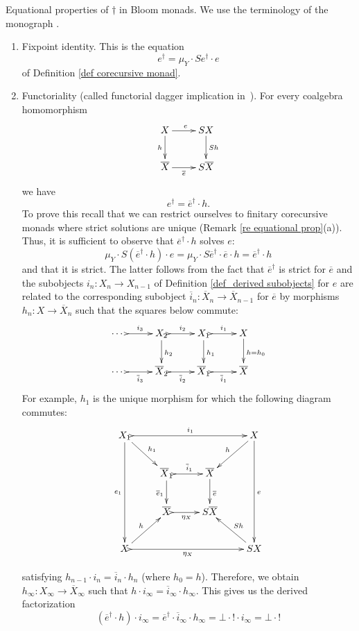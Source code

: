 \documentclass{LMCS}
\theoremstyle{plain}
\theoremstyle{definition}
\numberwithin{equation}{section}
\begin{document}
\begin{exa}
Equational properties of $\dag$ in Bloom monads. We use the terminology of the monograph \cite{be}.
\begin{enumerate}[label=\({\alph*}]
\item Fixpoint identity. This is the equation
$$e^\dag=\mu_Y\cdot Se^\dag\cdot e$$
of Definition \ref{def corecursive monad}.

\item Functoriality (called functorial dagger implication in~\cite{be}). For every coalgebra homomorphism
$$\xymatrix{
X\ar[r]^e\ar[d]_-h&SX\ar[d]^-{Sh}\\
\overline{X}\ar[r]_-{\overline{e}}&S\overline X
}$$
we have
$$e^\dag={\overline e}^\dagger\cdot h.$$
To prove this recall that we can restrict ourselves to finitary
corecursive monads where strict solutions are unique (Remark
\ref{re equational prop}(a)).
Thus, it is sufficient to observe that $\overline{e}^\dag\cdot h$ solves $e$:
$$\mu_Y\cdot S(\overline{e}^\dag\cdot h)\cdot e=\mu_Y\cdot S\overline e^\dag\cdot \overline e\cdot h=\overline e^\dag\cdot h$$
and that it is strict. The latter follows from the fact that $\overline e^\dag$ is strict for $\overline e$ and the subobjects $i_n:X_n\to X_{n-1}$ of Definition \ref{def_derived subobjects} for $e$ are related to the corresponding subobject $\overline i_n:\overline X_n\to \overline X_{n-1}$ for $\overline e$ by morphisms $h_n:X\to \overline X_n$ such that the squares below commute:
\[
\xymatrix{
  \cdots\  
  \ar@{>->}[r]^{i_3} 
  &
  X_2
  \ar@{>->}[r]^{i_2} 
  \ar[d]^{h_2}
  &
  X_1
  \ar@{>->}[r]^{i_1} 
  \ar[d]^{h_1}
  &
  X
  \ar[d]^{h = h_0}
  \\
  \cdots\ 
  \ar@{>->}[r]_{\overline i_3} 
  &
  \overline X_2
  \ar@{>->}[r]_{\overline i_2}
  &
  \overline X_1
  \ar@{>->}[r]_{\overline i_1}
  &
  \overline X 
}
\]
For example, $h_1$ is the unique morphism for which the following diagram commutes:
\[
\xymatrix{
  X_1
  \ar[ddd]_{e_1}
  \ar@{>->}[rrr]^-{i_1}
  \ar[rd]^{h_1}
  &&&
  X
  \ar[ddd]^{e}
  \ar[ld]_h
  \\
  &
  \overline X_1
  \ar@{>->}[r]^-{\overline i_1}
  \ar[d]_{\overline e_1}
  &
  \overline X
  \ar[d]^{\overline e}
  \\
  &
  \overline X
  \ar@{>->}[r]_-{\eta_X}
  &
  S\overline X
  \\
  X
  \ar@{>->}[rrr]_-{\eta_X}
  \ar[ru]^h
  &&&
  SX
  \ar[lu]_{Sh}
}
\]

satisfying $h_{n-1}\cdot i_n=\overline i_n\cdot h_n$ (where $h_0=h$). Therefore, we obtain $h_\infty :X_\infty\to\overline X_\infty$ such that $h\cdot i_\infty=\overline i_\infty\cdot h_\infty$. This gives us the derived factorization
$$(\overline e^\dag\cdot h)\cdot i_\infty=\overline e^\dag \cdot \overline i_\infty\cdot h_\infty=\bot\cdot !\cdot i_\infty=\bot\cdot !$$


\end{enumerate}
\end{exa}
\end{document}

